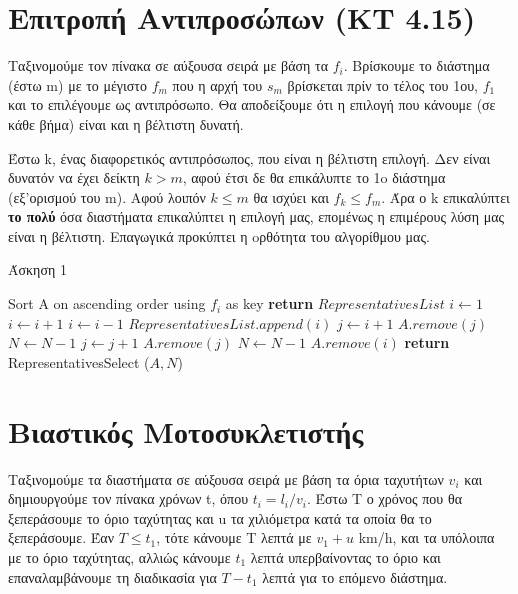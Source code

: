 \documentclass[a4paper,11pt]{article}
\begin{document}
\renewcommand{\labelenumi}{\roman{enumi})}
\renewcommand{\labelenumii}{(\arabic{enumii})}



\section{Επιτροπή Αντιπροσώπων (KT 4.15)} \setcounter{section}{1}
Ταξινομούμε τον πίνακα σε αύξουσα σειρά με βάση τα $f_i$. Βρίσκουμε το διάστημα (έστω m) με το
μέγιστο $f_m$ που η αρχή του $s_m$ βρίσκεται πρίν το τέλος του 1ου, $f_1$ και
το επιλέγουμε ως αντιπρόσωπο.
Θα αποδείξουμε ότι η επιλογή που κάνουμε (σε κάθε βήμα) είναι και η βέλτιστη
δυνατή.

Έστω k, ένας διαφορετικός αντιπρόσωπος, που είναι η βέλτιστη επιλογή. Δεν
είναι δυνατόν να έχει δείκτη $k > m$, αφού έτσι δε θα επικάλυπτε το 1o διάστημα
(εξ'ορισμού του m). Αφού λοιπόν $k \leq m$ θα ισχύει και $f_k \leq f_m$. Άρα ο
k επικαλύπτει \textbf{το πολύ} όσα διαστήματα επικαλύπτει η επιλογή μας,
επομένως η επιμέρους λύση μας είναι η βέλτιστη.
Eπαγωγικά προκύπτει η oρθότητα του αλγορίθμου μας.

\begin{algorithm}[H]
\caption{Άσκηση 1}
\begin{algorithmic}[1]
    \State Sort A on ascending order using $f_i$ as key
    \State \textbf{return} $RepresentativesList$
    \Else
    \State $i \gets 1$
        \State $i \gets i+1$
    \EndWhile
    \State $i \gets i-1$
    \State $RepresentativesList.append (i)$
    \State $j \gets i+1$
	\State $A.remove(j)$
	\State $N \gets N-1$
	\State $j \gets j+1$
    \EndWhile
	\State $A.remove (j)$
	\State $N \gets N-1$
    \EndFor
    \State $A.remove(i)$
    \State \textbf{return} RepresentativesSelect ($A, N$)
    \EndIf
\EndProcedure
\end{algorithmic}
\end{algorithm}



\section{Βιαστικός Μοτοσυκλετιστής}
Ταξινομούμε τα διαστήματα σε αύξουσα σειρά με βάση τα όρια ταχυτήτων $v_i$ και
δημιουργούμε τον πίνακα χρόνων t, όπου $t_i = l_i/v_i$.
Έστω Τ ο χρόνος που θα ξεπεράσουμε το όριο ταχύτητας και u τα χιλιόμετρα κατά
τα οποία θα το ξεπεράσουμε. Έαν $T \leq t_1$, τότε κάνουμε Τ λεπτά με $v_1 +
u$ km/h, και τα υπόλοιπα με το όριο ταχύτητας, αλλιώς κάνουμε $t_1$ λεπτά
υπερβαίνοντας το όριο και επαναλαμβάνουμε τη διαδικασία για $T - t_1$ λεπτά
για το επόμενο διάστημα.
\end{document}
